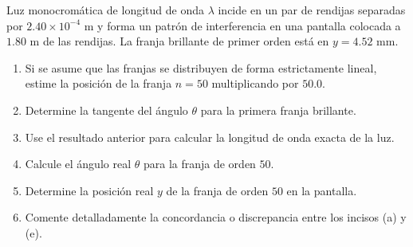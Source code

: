 \item Luz monocromática de longitud de onda $\lambda$ incide en un par de rendijas separadas por $2.40 \times 10^{-4}\text{ m}$ y forma un patrón de interferencia en una pantalla colocada a $1.80\text{ m}$ de las rendijas. La franja brillante de primer orden está en $y = 4.52\text{ mm}$.
\begin{enumerate}
    \item Si se asume que las franjas se distribuyen de forma estrictamente lineal, estime la posición de la franja $n = 50$ multiplicando por $50.0$.
    \item Determine la tangente del ángulo $\theta$ para la primera franja brillante.
    \item Use el resultado anterior para calcular la longitud de onda exacta de la luz.
    \item Calcule el ángulo real $\theta$ para la franja de orden $50$.
    \item Determine la posición real $y$ de la franja de orden $50$ en la pantalla.
    \item Comente detalladamente la concordancia o discrepancia entre los incisos (a) y (e).
\end{enumerate}